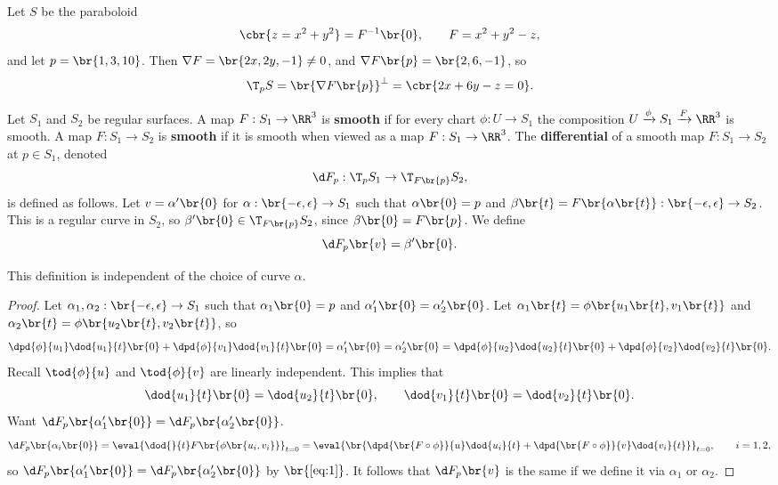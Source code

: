 \begin{example*}
Let $ S $ be the paraboloid
$$ \cbr{z = x^2 + y^2} = F^{-1}\br{0}, \qquad F = x^2 + y^2 - z, $$
and let $ p = \br{1, 3, 10} $. Then $ \nabla F = \br{2x, 2y, -1} \ne 0 $, and $ \nabla F\br{p} = \br{2, 6, -1} $, so
$$ \T_p S = \br{\nabla F\br{p}}^\perp = \cbr{2x + 6y - z = 0}. $$
\end{example*}

\begin{definition}
Let $ S_1 $ and $ S_2 $ be regular surfaces. A map $ F : S_1 \to \RR^3 $ is \textbf{smooth} if for every chart $ \phi : U \to S_1 $ the composition $ U \xrightarrow{\phi} S_1 \xrightarrow{F} \RR^3 $ is smooth. A map $ F : S_1 \to S_2 $ is \textbf{smooth} if it is smooth when viewed as a map $ F : S_1 \to \RR^3 $. The \textbf{differential} of a smooth map $ F : S_1 \to S_2 $ at $ p \in S_1 $, denoted
$$ \d F_p : \T_p S_1 \to \T_{F\br{p}} S_2, $$
is defined as follows. Let $ v = \alpha'\br{0} $ for $ \alpha : \br{-\epsilon, \epsilon} \to S_1 $ such that $ \alpha\br{0} = p $ and $ \beta\br{t} = F\br{\alpha\br{t}} : \br{-\epsilon, \epsilon} \to S_2 $. This is a regular curve in $ S_2 $, so $ \beta'\br{0} \in \T_{F\br{p}} S_2 $, since $ \beta\br{0} = F\br{p} $. We define
$$ \d F_p\br{v} = \beta'\br{0}. $$
\end{definition}

\begin{proposition}
This definition is independent of the choice of curve $ \alpha $.
\end{proposition}

\begin{proof}
Let $ \alpha_1, \alpha_2 : \br{-\epsilon, \epsilon} \to S_1 $ such that $ \alpha_1\br{0} = p $ and $ \alpha_1'\br{0} = \alpha_2'\br{0} $. Let $ \alpha_1\br{t} = \phi\br{u_1\br{t}, v_1\br{t}} $ and $ \alpha_2\br{t} = \phi\br{u_2\br{t}, v_2\br{t}} $, so
$$ \dpd{\phi}{u_1}\dod{u_1}{t}\br{0} + \dpd{\phi}{v_1}\dod{v_1}{t}\br{0} = \alpha_1'\br{0} = \alpha_2'\br{0} = \dpd{\phi}{u_2}\dod{u_2}{t}\br{0} + \dpd{\phi}{v_2}\dod{v_2}{t}\br{0}. $$
Recall $ \tod{\phi}{u} $ and $ \tod{\phi}{v} $ are linearly independent. This implies that
\begin{equation}
\label{eq:1}
\dod{u_1}{t}\br{0} = \dod{u_2}{t}\br{0}, \qquad \dod{v_1}{t}\br{0} = \dod{v_2}{t}\br{0}.
\end{equation}
Want $ \d F_p\br{\alpha_1'\br{0}} = \d F_p\br{\alpha_2'\br{0}} $.
$$ \d F_p\br{\alpha_i\br{0}} = \eval{\dod{}{t}F\br{\phi\br{u_i, v_i}}}_{t = 0} = \eval{\br{\dpd{\br{F \circ \phi}}{u}\dod{u_i}{t} + \dpd{\br{F \circ \phi}}{v}\dod{v_i}{t}}}_{t = 0}, \qquad i = 1, 2, $$
so $ \d F_p\br{\alpha_1'\br{0}} = \d F_p\br{\alpha_2'\br{0}} $ by $ \br{\ref{eq:1}} $. It follows that $ \d F_p\br{v} $ is the same if we define it via $ \alpha_1 $ or $ \alpha_2 $.
\end{proof}

